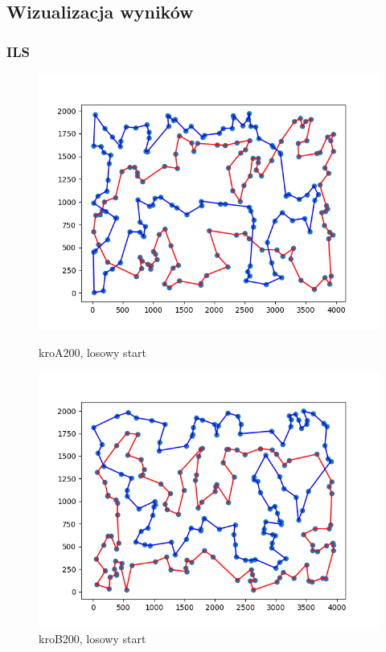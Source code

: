 \documentclass[11pt]{article}
\begin{document}
\subsection{Wizualizacja wyników}\label{subsec:wizualizacja-wynikow}

\subsubsection{ILS}

\begin{figure}[H]
    \begin{minipage}[t]{0.45\textwidth}
        \centering
        \includegraphics[width=\linewidth]{best_paths/kroA200/ILS}
        \caption{kroA200, losowy start}
    \end{minipage}
    \hfill
    \begin{minipage}[t]{0.45\textwidth}
        \centering
        \includegraphics[width=\linewidth]{best_paths/kroB200/ILS}
        \caption{kroB200, losowy start}
    \end{minipage}\label{fig:figure1}
\end{figure}
\end{document}
